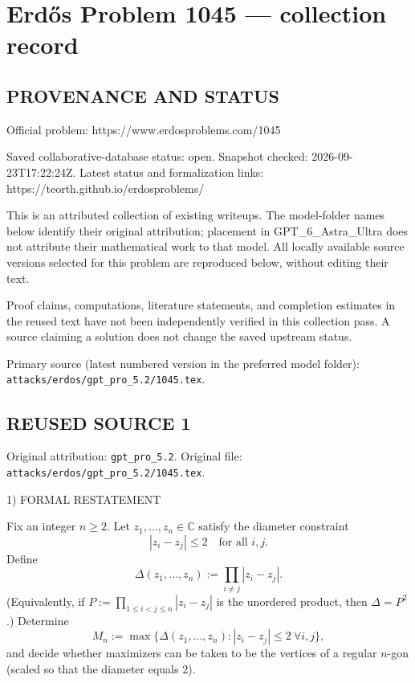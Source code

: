 \section*{Erd\H{o}s Problem 1045 --- collection record}

\subsection*{PROVENANCE AND STATUS}
Official problem: https://www.erdosproblems.com/1045

Saved collaborative-database status: open.
Snapshot checked: 2026-09-23T17:22:24Z.
Latest status and formalization links: https://teorth.github.io/erdosproblems/

This is an attributed collection of existing writeups. The model-folder names below identify their original attribution; placement in GPT\_6\_Astra\_Ultra does not attribute their mathematical work to that model. All locally available source versions selected for this problem are reproduced below, without editing their text.

Proof claims, computations, literature statements, and completion estimates in the reused text have not been independently verified in this collection pass. A source claiming a solution does not change the saved upstream status.

Primary source (latest numbered version in the preferred model folder): \texttt{attacks/erdos/gpt\_pro\_5.2/1045.tex}.

\subsection*{REUSED SOURCE 1}
Original attribution: \texttt{gpt\_pro\_5.2}.
Original file: \texttt{attacks/erdos/gpt\_pro\_5.2/1045.tex}.


1) FORMAL RESTATEMENT

Fix an integer $n\ge 2$. Let $z_1,\dots,z_n\in\mathbb C$ satisfy the diameter constraint
\[
  |z_i-z_j|\le 2\quad\text{for all }i,j.
\]
Define
\[
  \Delta(z_1,\dots,z_n):=\prod_{i\ne j}|z_i-z_j|.
\]
(Equivalently, if $P:=\prod_{1\le i<j\le n}|z_i-z_j|$ is the unordered product, then $\Delta=P^2$.)
Determine
\[
  M_n:=\max\{\Delta(z_1,\dots,z_n): |z_i-z_j|\le 2\ \forall i,j\},
\]
and decide whether maximizers can be taken to be the vertices of a regular $n$-gon (scaled so that the
diameter equals $2$).


